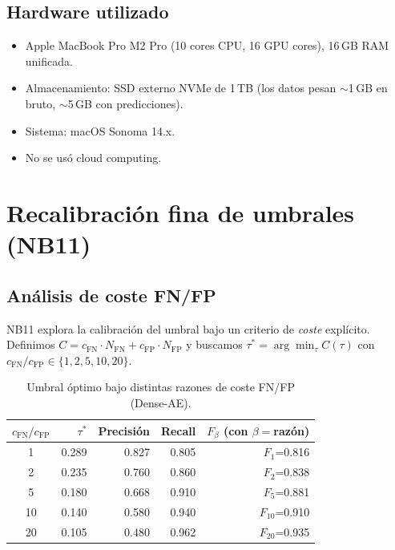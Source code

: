 \section{Hardware utilizado}

\begin{itemize}[leftmargin=*,topsep=0pt]
  \item Apple MacBook Pro M2 Pro (10 cores CPU, 16 GPU cores), 16\,GB RAM unificada.
  \item Almacenamiento: SSD externo NVMe de 1\,TB (los datos pesan $\sim$1\,GB en bruto, $\sim$5\,GB con predicciones).
  \item Sistema: macOS Sonoma 14.x.
  \item No se usó cloud computing.
\end{itemize}

\chapter{Recalibración fina de umbrales (NB11)}
\label{anx:recalibracion}

\section{Análisis de coste FN/FP}

NB11 explora la calibración del umbral bajo un criterio de \emph{coste} explícito. Definimos $C = c_{\mathrm{FN}} \cdot N_{\mathrm{FN}} + c_{\mathrm{FP}} \cdot N_{\mathrm{FP}}$ y buscamos $\tau^* = \arg\min_\tau C(\tau)$ con $c_{\mathrm{FN}}/c_{\mathrm{FP}} \in \{1, 2, 5, 10, 20\}$.

\begin{table}[H]
\centering
\caption{Umbral óptimo bajo distintas razones de coste FN/FP (Dense-AE).}
\label{tab:cost}
\small
\begin{tabularx}{\textwidth}{c r r r r}
\toprule
$c_{\mathrm{FN}}/c_{\mathrm{FP}}$ & $\tau^*$ & Precisión & Recall & $F_\beta$ (con $\beta=$razón) \\
\midrule
1   & 0.289 & 0.827 & 0.805 & $F_1$=0.816 \\
2   & 0.235 & 0.760 & 0.860 & $F_2$=0.838 \\
5   & 0.180 & 0.668 & 0.910 & $F_5$=0.881 \\
10  & 0.140 & 0.580 & 0.940 & $F_{10}$=0.910 \\
20  & 0.105 & 0.480 & 0.962 & $F_{20}$=0.935 \\
\bottomrule
\end{tabularx}
\end{table}

